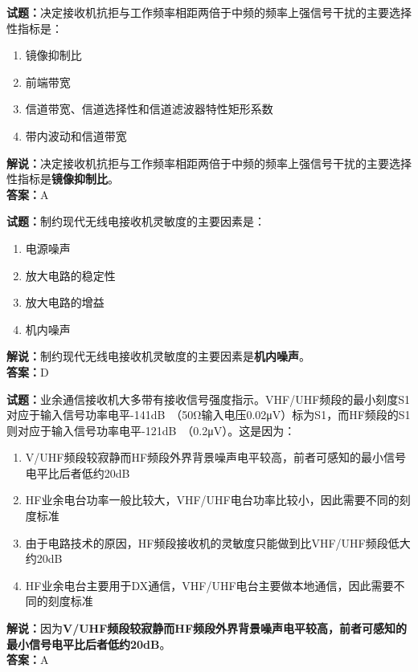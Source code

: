 \documentclass{ctexbook}
\begin{document}
\bigskip


\noindent\textbf{试题：}决定接收机抗拒与工作频率相距两倍于中频的频率上强信号干扰的主要选择性指标是：
\begin{enumerate}[leftmargin=3em]
\item 镜像抑制比
\item 前端带宽
\item 信道带宽、信道选择性和信道滤波器特性矩形系数
\item 带内波动和信道带宽
\end{enumerate}
\noindent\textbf{解说：}决定接收机抗拒与工作频率相距两倍于中频的频率上强信号干扰的主要选择性指标是\textbf{镜像抑制比}。\\\noindent\textbf{答案：}A



\bigskip


\noindent\textbf{试题：}制约现代无线电接收机灵敏度的主要因素是：
\begin{enumerate}[leftmargin=3em]
\item 电源噪声
\item 放大电路的稳定性
\item 放大电路的增益
\item 机内噪声
\end{enumerate}
\noindent\textbf{解说：}制约现代无线电接收机灵敏度的主要因素是\textbf{机内噪声}。\\\noindent\textbf{答案：}D


\bigskip


\noindent\textbf{试题：}业余通信接收机大多带有接收信号强度指示。VHF/UHF频段的最小刻度S1对应于输入信号功率电平-141\unit[qualifier-mode=combine]{\deci\bel{}}（50Ω输入电压0.02μV）标为S1，而HF频段的S1则对应于输入信号功率电平-121\unit[qualifier-mode=combine]{\deci\bel{}}（0.2μV）。这是因为：
\begin{enumerate}[leftmargin=3em]
\item V/UHF频段较寂静而HF频段外界背景噪声电平较高，前者可感知的最小信号电平比后者低约20dB
\item HF业余电台功率一般比较大，VHF/UHF电台功率比较小，因此需要不同的刻度标准
\item 由于电路技术的原因，HF频段接收机的灵敏度只能做到比VHF/UHF频段低大约20dB
\item HF业余电台主要用于DX通信，VHF/UHF电台主要做本地通信，因此需要不同的刻度标准
\end{enumerate}
\noindent\textbf{解说：}因为\textbf{V/UHF频段较寂静而HF频段外界背景噪声电平较高，前者可感知的最小信号电平比后者低约20dB}。\\\noindent\textbf{答案：}A
\end{document}
